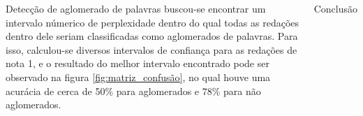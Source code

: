 \documentclass[
  xcolor={hyperref,svgnames,x11names,table},
  hyperref={pdfencoding=unicode,plainpages=false,pdfpagelabels=true,breaklinks=true},
  brazilian, english
]{beamer}
\begin{document}
\begin{frame}[fragile]
\begin{columns}[T]
\begin{block}{Detecção de aglomerado de palavras}
      buscou-se encontrar um intervalo númerico de perplexidade dentro do qual todas as redações dentro dele seriam classificadas como aglomerados de palavras. Para isso, calculou-se diversos intervalos de confiança para as redações de nota 1, e o resultado do melhor intervalo encontrado pode ser observado na figura \ref{fig:matriz_confusão}, no qual houve uma acurácia de cerca de 50\% para aglomerados e 78\% para não aglomerados.
    

    
    \end{block}

  \begin{block}{Conclusão}
  \justifying
  
  



\end{block}
\end{columns}
\end{frame}
\end{document}
